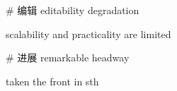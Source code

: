 
# 编辑
editability degradation



scalability and practicality are limited


# 进展
remarkable headway

taken the front in sth


